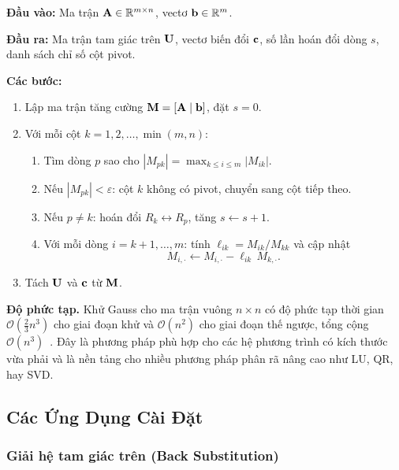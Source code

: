 \begin{tcolorbox}[enhanced, colback=blue!8!white, colframe=primaryblue,
    title=\textbf{Thuật toán: Khử Gauss với Partial Pivoting}, fonttitle=\bfseries]
\textbf{Đầu vào:} Ma trận $\mathbf{A} \in \mathbb{R}^{m \times n}$, vectơ $\mathbf{b} \in \mathbb{R}^m$.

\textbf{Đầu ra:} Ma trận tam giác trên $\mathbf{U}$, vectơ biến đổi $\mathbf{c}$, số lần hoán đổi dòng $s$, danh sách chỉ số cột pivot.

\textbf{Các bước:}
\begin{enumerate}[noitemsep]
    \item Lập ma trận tăng cường $\mathbf{M} = [\mathbf{A} \mid \mathbf{b}]$, đặt $s = 0$.
    \item Với mỗi cột $k = 1, 2, \ldots, \min(m,n)$:
    \begin{enumerate}[noitemsep]
        \item Tìm dòng $p$ sao cho $|M_{pk}| = \max_{k \le i \le m} |M_{ik}|$.
        \item Nếu $|M_{pk}| < \varepsilon$: cột $k$ không có pivot, chuyển sang cột tiếp theo.
        \item Nếu $p \neq k$: hoán đổi $R_k \leftrightarrow R_p$, tăng $s \leftarrow s + 1$.
        \item Với mỗi dòng $i = k+1, \ldots, m$: tính $\ell_{ik} = M_{ik}/M_{kk}$ và cập nhật
        \begin{equation}
            M_{i,\cdot} \leftarrow M_{i,\cdot} - \ell_{ik}\,M_{k,\cdot}.
        \end{equation}
    \end{enumerate}
    \item Tách $\mathbf{U}$ và $\mathbf{c}$ từ $\mathbf{M}$.
\end{enumerate}
\end{tcolorbox}

\textbf{Độ phức tạp.} Khử Gauss cho ma trận vuông $n \times n$ có độ phức tạp thời gian $\mathcal{O}(\tfrac{2}{3}n^3)$ cho giai đoạn khử và $\mathcal{O}(n^2)$ cho giai đoạn thế ngược, tổng cộng $\mathcal{O}(n^3)$~\cite{golub2013}. Đây là phương pháp phù hợp cho các hệ phương trình có kích thước vừa phải và là nền tảng cho nhiều phương pháp phân rã nâng cao như LU, QR, hay SVD.

\subsection{Các Ứng Dụng Cài Đặt}

\subsubsection{Giải hệ tam giác trên (Back Substitution)}


